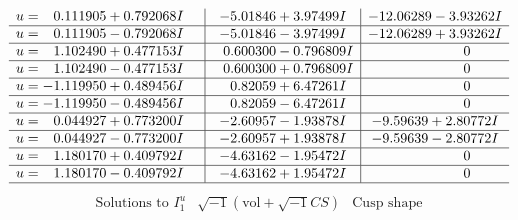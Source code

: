 \documentclass[1p]{elsarticle_modified}
\theoremstyle{definition}
\newcommand{\I}{\sqrt{-1}}
\begin{document}
$$\begin{array}{c|c|c}
\begin{aligned}
u &= \phantom{-}0.111905 + 0.792068 I\end{aligned}
 & -5.01846 + 3.97499 I & -12.06289 - 3.93262 I \\ \hline\begin{aligned}
u &= \phantom{-}0.111905 - 0.792068 I\end{aligned}
 & -5.01846 - 3.97499 I & -12.06289 + 3.93262 I \\ \hline\begin{aligned}
u &= \phantom{-}1.102490 + 0.477153 I\end{aligned}
 & \phantom{-}0.600300 - 0.796809 I & \phantom{-0.000000 } 0 \\ \hline\begin{aligned}
u &= \phantom{-}1.102490 - 0.477153 I\end{aligned}
 & \phantom{-}0.600300 + 0.796809 I & \phantom{-0.000000 } 0 \\ \hline\begin{aligned}
u &= -1.119950 + 0.489456 I\end{aligned}
 & \phantom{-}0.82059 + 6.47261 I & \phantom{-0.000000 } 0 \\ \hline\begin{aligned}
u &= -1.119950 - 0.489456 I\end{aligned}
 & \phantom{-}0.82059 - 6.47261 I & \phantom{-0.000000 } 0 \\ \hline\begin{aligned}
u &= \phantom{-}0.044927 + 0.773200 I\end{aligned}
 & -2.60957 - 1.93878 I & -9.59639 + 2.80772 I \\ \hline\begin{aligned}
u &= \phantom{-}0.044927 - 0.773200 I\end{aligned}
 & -2.60957 + 1.93878 I & -9.59639 - 2.80772 I \\ \hline\begin{aligned}
u &= \phantom{-}1.180170 + 0.409792 I\end{aligned}
 & -4.63162 - 1.95472 I & \phantom{-0.000000 } 0 \\ \hline\begin{aligned}
u &= \phantom{-}1.180170 - 0.409792 I\end{aligned}
 & -4.63162 + 1.95472 I & \phantom{-0.000000 } 0\\
 \hline 
 \end{array}$$\newpage$$\begin{array}{c|c|c}  
\text{Solutions to }I^u_{1}& \I (\text{vol} + \sqrt{-1}CS) & \text{Cusp shape}\\

\end{array}$$
\end{document}
